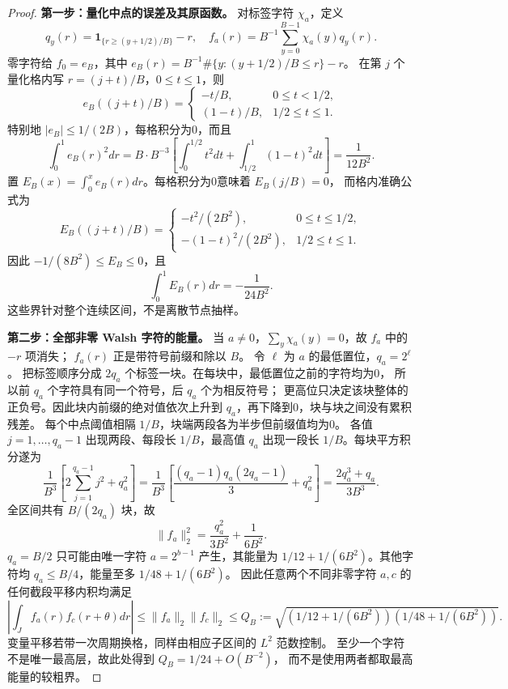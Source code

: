 \documentclass[UTF8,a4paper,11pt,fontset=fandol]{ctexart}
\theoremstyle{remark}
\begin{document}
\begin{proof}
\textbf{第一步：量化中点的误差及其原函数。}
对标签字符 $\chi_a$，定义
\[
 q_y(r)=\mathbf1_{\{r\ge(y+1/2)/B\}}-r,
 \quad f_a(r)=B^{-1}\sum_{y=0}^{B-1}\chi_a(y)q_y(r).
\]
零字符给 $f_0=e_B$，其中
$e_B(r)=B^{-1}\#\{y:(y+1/2)/B\le r\}-r$。
在第 $j$ 个量化格内写 $r=(j+t)/B$，$0\le t\le1$，则
\[
 e_B((j+t)/B)=\begin{cases}-t/B,&0\le t<1/2,\\(1-t)/B,&1/2\le t\le1.
 \end{cases}
\]
特别地 $|e_B|\le1/(2B)$，每格积分为0，而且
\[
 \int_0^1e_B(r)^2dr
 =B\cdot B^{-3}\left[\int_0^{1/2}t^2dt+
 \int_{1/2}^1(1-t)^2dt\right]=\frac1{12B^2}.
\]
置 $E_B(x)=\int_0^xe_B(r)dr$。每格积分为0意味着 $E_B(j/B)=0$，
而格内准确公式为
\[
 E_B((j+t)/B)=\begin{cases}-t^2/(2B^2),&0\le t\le1/2,\\
 -(1-t)^2/(2B^2),&1/2\le t\le1.
 \end{cases}
\]
因此 $-1/(8B^2)\le E_B\le0$，且
\[
 \int_0^1E_B(r)dr=-\frac1{24B^2}.
\]
这些界针对整个连续区间，不是离散节点抽样。

\textbf{第二步：全部非零 Walsh 字符的能量。}
当 $a\ne0$，$\sum_y\chi_a(y)=0$，故 $f_a$ 中的 $-r$ 项消失；
$f_a(r)$ 正是带符号前缀和除以 $B$。
令 $\ell$ 为 $a$ 的最低置位，$q_a=2^\ell$。
把标签顺序分成 $2q_a$ 个标签一块。在每块中，最低置位之前的字符均为0，
所以前 $q_a$ 个字符具有同一个符号，后 $q_a$ 个为相反符号；
更高位只决定该块整体的正负号。因此块内前缀的绝对值依次上升到
$q_a$，再下降到0，块与块之间没有累积残差。
每个中点阈值相隔 $1/B$，块端两段各为半步但前缀值均为0。
各值 $j=1,\ldots,q_a-1$ 出现两段、每段长 $1/B$，最高值 $q_a$
出现一段长 $1/B$。每块平方积分遂为
\[
 \frac1{B^3}\left[2\sum_{j=1}^{q_a-1}j^2+q_a^2\right]
 =\frac1{B^3}\left[\frac{(q_a-1)q_a(2q_a-1)}3+q_a^2\right]
 =\frac{2q_a^3+q_a}{3B^3}.
\]
全区间共有 $B/(2q_a)$ 块，故
\begin{equation}\label{eq:paperwalshenergy}
 \|f_a\|_2^2=\frac{q_a^2}{3B^2}+\frac1{6B^2}.
\end{equation}
$q_a=B/2$ 只可能由唯一字符 $a=2^{b-1}$ 产生，其能量为
$1/12+1/(6B^2)$。其他字符均 $q_a\le B/4$，能量至多
$1/48+1/(6B^2)$。
因此任意两个不同非零字符 $a,c$ 的任何截段平移内积均满足
\[
 |\int_J f_a(r)f_c(r+\theta)dr|
 \le\|f_a\|_2\|f_c\|_2
 \le Q_B:=\sqrt{(1/12+1/(6B^2))(1/48+1/(6B^2))}.
\]
变量平移若带一次周期换格，同样由相应子区间的 $L^2$ 范数控制。
至少一个字符不是唯一最高层，故此处得到 $Q_B=1/24+O(B^{-2})$，
而不是使用两者都取最高能量的较粗界。


\end{proof}
\end{document}
